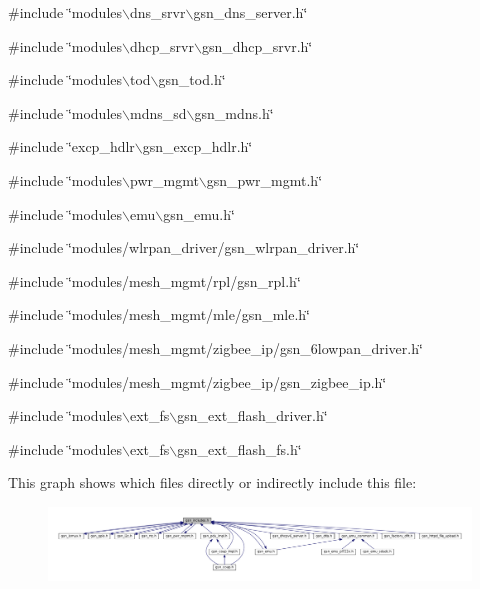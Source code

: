 {\ttfamily \#include \char`\"{}modules$\backslash$dns\_\-srvr$\backslash$gsn\_\-dns\_\-server.h\char`\"{}}\par
{\ttfamily \#include \char`\"{}modules$\backslash$dhcp\_\-srvr$\backslash$gsn\_\-dhcp\_\-srvr.h\char`\"{}}\par
{\ttfamily \#include \char`\"{}modules$\backslash$tod$\backslash$gsn\_\-tod.h\char`\"{}}\par
{\ttfamily \#include \char`\"{}modules$\backslash$mdns\_\-sd$\backslash$gsn\_\-mdns.h\char`\"{}}\par
{\ttfamily \#include \char`\"{}excp\_\-hdlr$\backslash$gsn\_\-excp\_\-hdlr.h\char`\"{}}\par
{\ttfamily \#include \char`\"{}modules$\backslash$pwr\_\-mgmt$\backslash$gsn\_\-pwr\_\-mgmt.h\char`\"{}}\par
{\ttfamily \#include \char`\"{}modules$\backslash$emu$\backslash$gsn\_\-emu.h\char`\"{}}\par
{\ttfamily \#include \char`\"{}modules/wlrpan\_\-driver/gsn\_\-wlrpan\_\-driver.h\char`\"{}}\par
{\ttfamily \#include \char`\"{}modules/mesh\_\-mgmt/rpl/gsn\_\-rpl.h\char`\"{}}\par
{\ttfamily \#include \char`\"{}modules/mesh\_\-mgmt/mle/gsn\_\-mle.h\char`\"{}}\par
{\ttfamily \#include \char`\"{}modules/mesh\_\-mgmt/zigbee\_\-ip/gsn\_\-6lowpan\_\-driver.h\char`\"{}}\par
{\ttfamily \#include \char`\"{}modules/mesh\_\-mgmt/zigbee\_\-ip/gsn\_\-zigbee\_\-ip.h\char`\"{}}\par
{\ttfamily \#include \char`\"{}modules$\backslash$ext\_\-fs$\backslash$gsn\_\-ext\_\-flash\_\-driver.h\char`\"{}}\par
{\ttfamily \#include \char`\"{}modules$\backslash$ext\_\-fs$\backslash$gsn\_\-ext\_\-flash\_\-fs.h\char`\"{}}\par
This graph shows which files directly or indirectly include this file:
\nopagebreak
\begin{figure}[H]
\begin{center}
\leavevmode
\includegraphics[width=400pt]{a00751}
\end{center}
\end{figure}

